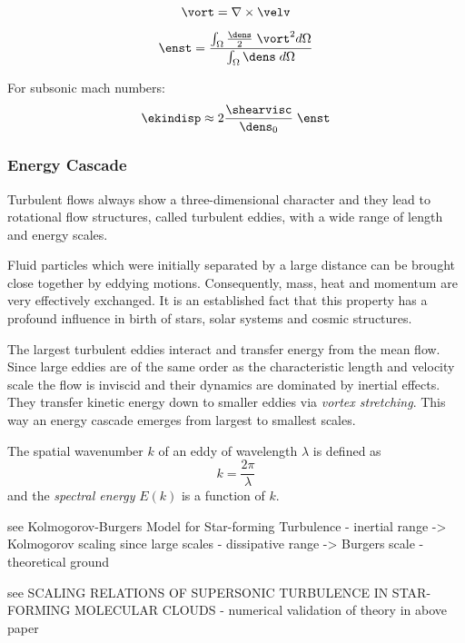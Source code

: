 \begin{equation}
\label{eq:vort}
    \vort = \nabla \times \velv
\end{equation}

\begin{equation}
\label{eq:enst}
    \enst = \frac{\int_\Omega \frac{\dens}{2} \; \vort^2 d\Omega}{\int_\Omega \dens \; d\Omega}
\end{equation}

For subsonic mach numbers:
\begin{equation}
\label{eq:ekindisp2}
    \ekindisp \approx 2 \frac{\shearvisc}{\dens_0} \; \enst
\end{equation}

\subsubsection{Energy Cascade}

Turbulent flows always show a three-dimensional character and they lead to
rotational flow structures, called turbulent eddies, with a wide range of
length and energy scales.

Fluid particles which were initially separated by a large distance can be
brought close together by eddying motions. Consequently, mass, heat and momentum
are very effectively exchanged. It is an established fact that this
property has a profound influence in birth of stars, solar systems and cosmic
structures.

The largest turbulent eddies interact and transfer energy from the mean flow.
Since large eddies are of the same order as the characteristic length and
velocity scale the flow is inviscid and their dynamics are dominated by
inertial effects. They transfer kinetic energy down to smaller eddies via
\emph{vortex stretching}. This way an energy cascade emerges from largest to
smallest scales.

The spatial wavenumber $k$ of an eddy of wavelength $\lambda$ is defined as
\begin{equation}
    k = \frac{2\pi}{\lambda}
\end{equation}
and the \emph{spectral energy} $E(k)$ is a function of $k$.

see Kolmogorov-Burgers Model for Star-forming Turbulence
    - inertial range -> Kolmogorov scaling since large scales
    - dissipative range -> Burgers scale
    - theoretical ground

see SCALING RELATIONS OF SUPERSONIC TURBULENCE IN STAR-FORMING MOLECULAR CLOUDS
    - numerical validation of theory in above paper


